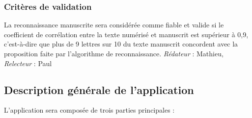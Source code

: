 \documentclass[oneside,a4paper,13pt]{article}
\begin{document}
\subsubsection{Critères de validation}
La reconnaissance manuscrite sera considérée comme fiable et valide si le coefficient de corrélation entre la texte numérisé et manuscrit est supérieur à 0,9, c’est-à-dire que plus de 9 lettres sur 10 du texte manuscrit concordent avec la proposition faite par l’algorithme de reconnaissance. 
\smallbreak\textit{Rédateur} : Mathieu, \textit{Relecteur} : Paul


\subsection{Description générale de l'application}
L’application sera composée de trois parties principales : 
\end{document}
